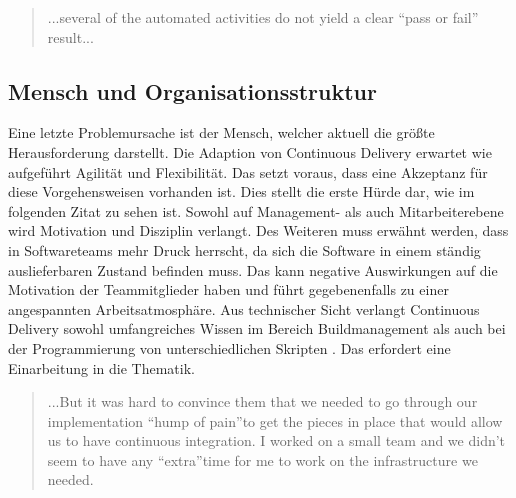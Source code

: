\begin{quote}\glqq ...several of the automated activities do not yield a clear “pass or fail” result... \grqq~\cite[S.65]{Laukkanen.2017}\end{quote}
%

\subsection{Mensch und Organisationsstruktur}
Eine letzte Problemursache ist der Mensch, welcher aktuell die größte Herausforderung darstellt. Die Adaption von Continuous Delivery erwartet wie aufgeführt Agilität und Flexibilität. Das setzt voraus, dass eine Akzeptanz für diese Vorgehensweisen vorhanden ist. Dies stellt die erste Hürde dar, wie im folgenden Zitat zu sehen ist. Sowohl auf Management- als auch Mitarbeiterebene wird Motivation und Disziplin verlangt. Des Weiteren muss erwähnt werden, dass in Softwareteams mehr Druck herrscht, da sich die Software in einem ständig auslieferbaren Zustand befinden muss. Das kann negative Auswirkungen auf die Motivation der Teammitglieder haben und führt gegebenenfalls zu einer angespannten Arbeitsatmosphäre. Aus technischer Sicht verlangt Continuous Delivery sowohl umfangreiches Wissen im Bereich Buildmanagement als auch bei der Programmierung von unterschiedlichen Skripten \cite{Laukkanen.2017}. Das erfordert eine Einarbeitung in die Thematik. 

\begin{quote}\glqq ...But it was hard to convince them that we needed to go through our implementation “hump of pain”to get the pieces in place that would allow us to have continuous integration. I worked on a small team and we didn’t seem to have any “extra”time for me to work on the infrastructure we needed. \grqq~\cite[S.373]{Stolberg.2009} \end{quote}
%

